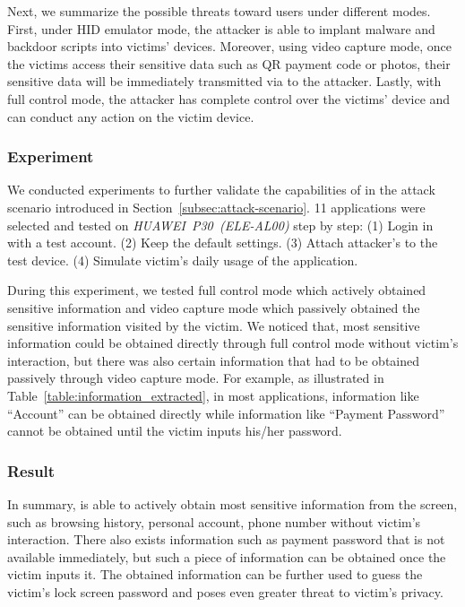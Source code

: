 Next, we summarize the possible threats toward users under different modes.
First, under \ac{HID} emulator mode, the attacker is able to implant malware and backdoor scripts into victims' devices. Moreover, using video capture mode, once the victims access their sensitive data such as QR payment  code or photos, their sensitive data will be immediately transmitted via \tool to the attacker. Lastly, with full control mode, the attacker has complete control over the victims' device and can conduct any action on the victim device.


\subsubsection{Experiment}

We conducted experiments to further validate the capabilities of \tool 
in the attack scenario introduced in Section~\ref{subsec:attack-scenario}.
11 applications were selected and tested on \mbox{\textit{HUAWEI P30 (ELE-AL00)}} step by step:
(1) Login in with a test account.
(2) Keep the default settings.
(3) Attach attacker's \tool to the test device.
(4) Simulate victim's daily usage of the application.

During this experiment, we tested full control mode which actively obtained sensitive information and video capture mode which passively obtained the sensitive information visited by the victim. We noticed that, most sensitive information could be obtained directly through full control mode without victim's interaction, but there was also certain information that had to be obtained passively through video capture mode. For example, as illustrated in Table~\ref{table:information_extracted}, in most applications, information like ``Account'' can be obtained directly while information like ``Payment Password'' cannot be obtained until the victim inputs his/her password.

\subsubsection{Result}
In summary, \tool is able to actively obtain most sensitive information from the screen, such as browsing history, personal account, phone number without victim's interaction. There also exists information such as payment password that is not available immediately, but such a piece of information can be obtained once the victim inputs it. The obtained information can be further used to guess the victim's lock screen password and poses even greater threat to victim's privacy.

